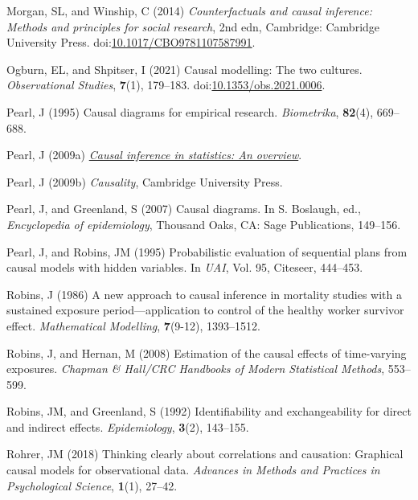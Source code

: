 \documentclass[
  singlecolumn]{article}
\newlength{\cslhangindent}
\newenvironment{CSLReferences}[2] %
 {\begin{list}{}{%
  \setlength{\itemindent}{0pt}
  \setlength{\leftmargin}{0pt}
  \setlength{\parsep}{0pt}
  \ifodd #1
   \setlength{\leftmargin}{\cslhangindent}
   \setlength{\itemindent}{-1\cslhangindent}
  \fi
  \setlength{\itemsep}{#2\baselineskip}}}
 {\end{list}}
\begin{document}
\begin{CSLReferences}{1}{0}
Morgan, SL, and Winship, C (2014) \emph{Counterfactuals and causal
inference: Methods and principles for social research}, 2nd edn,
Cambridge: Cambridge University Press.
doi:\href{https://doi.org/10.1017/CBO9781107587991}{10.1017/CBO9781107587991}.

Ogburn, EL, and Shpitser, I (2021) Causal modelling: The two cultures.
\emph{Observational Studies}, \textbf{7}(1), 179--183.
doi:\href{https://doi.org/10.1353/obs.2021.0006}{10.1353/obs.2021.0006}.

Pearl, J (1995) Causal diagrams for empirical research.
\emph{Biometrika}, \textbf{82}(4), 669--688.

Pearl, J (2009a) \emph{\href{https://doi.org/10.1214/09-SS057}{Causal
inference in statistics: An overview}}.

Pearl, J (2009b) \emph{Causality}, Cambridge University Press.

Pearl, J, and Greenland, S (2007) Causal diagrams. In S. Boslaugh, ed.,
\emph{Encyclopedia of epidemiology}, Thousand Oaks, CA: Sage
Publications, 149--156.

Pearl, J, and Robins, JM (1995) Probabilistic evaluation of sequential
plans from causal models with hidden variables. In \emph{UAI}, Vol. 95,
Citeseer, 444--453.

Robins, J (1986) A new approach to causal inference in mortality studies
with a sustained exposure period---application to control of the healthy
worker survivor effect. \emph{Mathematical Modelling}, \textbf{7}(9-12),
1393--1512.

Robins, J, and Hernan, M (2008) Estimation of the causal effects of
time-varying exposures. \emph{Chapman \& Hall/CRC Handbooks of Modern
Statistical Methods}, 553--599.

Robins, JM, and Greenland, S (1992) Identifiability and exchangeability
for direct and indirect effects. \emph{Epidemiology}, \textbf{3}(2),
143--155.

Rohrer, JM (2018) Thinking clearly about correlations and causation:
Graphical causal models for observational data. \emph{Advances in
Methods and Practices in Psychological Science}, \textbf{1}(1), 27--42.


\end{CSLReferences}
\end{document}
